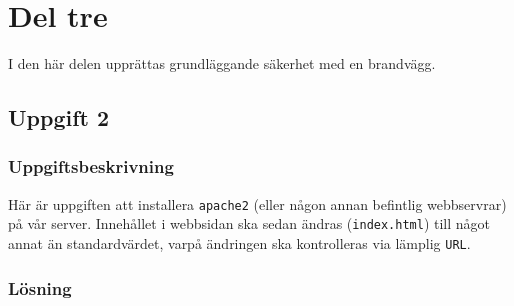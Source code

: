 %
%
%


\section{Del tre}
I den här delen upprättas grundläggande säkerhet med en brandvägg.

\subsection{Uppgift 2}
\subsubsection{Uppgiftsbeskrivning}
Här är uppgiften att installera \texttt{apache2} (eller någon annan befintlig
webbservrar) på vår server.
Innehållet i webbsidan ska sedan ändras (\texttt{index.html}) till något annat
än standardvärdet, varpå ändringen ska kontrolleras via lämplig \texttt{URL}.


\subsubsection{Lösning}
